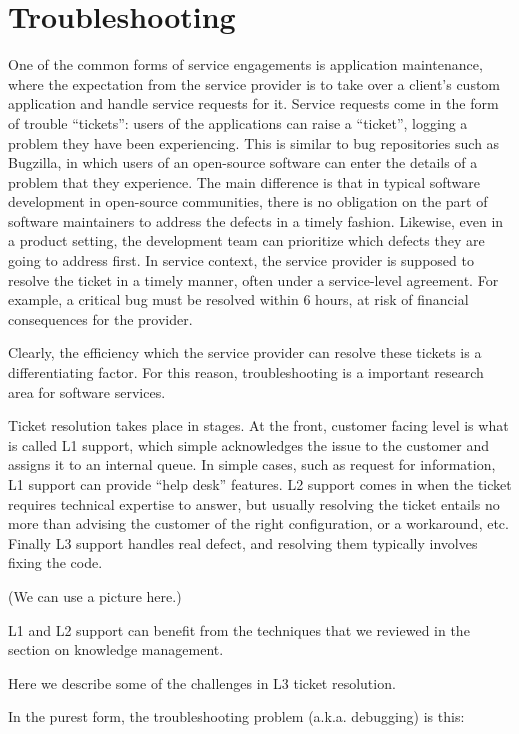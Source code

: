 \section{Troubleshooting}

One of the common forms of service engagements is application maintenance, where the expectation from the service provider is to take over a client's custom application and handle service requests for it.  Service requests come in the form of trouble ``tickets'': users of the applications can raise a ``ticket'', logging a problem they have been experiencing. This is similar to bug repositories such as Bugzilla, in which users of an open-source software can enter the details of a problem that they experience.  The main difference is that in typical software development in open-source communities, there is no obligation on the part of software maintainers to address the defects in a timely fashion. Likewise, even in a product setting, the development team can prioritize which defects they are going to address first.  In service context, the service provider is supposed to resolve the ticket in a timely manner, often under a service-level agreement. For example, a critical bug must be resolved within 6 hours, at risk of financial consequences for the provider. 

Clearly, the efficiency which the service provider can resolve these tickets is a differentiating factor. For this reason, troubleshooting is a important research area for software services.

Ticket resolution takes place in stages. At the front, customer facing level is what is called L1 support, which simple acknowledges the issue to the customer and assigns it to an internal queue. In simple cases, such as request for information, L1 support can provide ``help desk'' features. L2 support comes in when the ticket requires technical expertise to answer, but usually resolving the ticket entails no more than advising the customer of the right configuration, or a workaround, etc. Finally L3 support handles real defect, and resolving them typically involves fixing the code.

(We can use a picture here.)

L1 and L2 support can benefit from the techniques that we reviewed in the section on knowledge management.

Here we describe some of the challenges in L3 ticket resolution.

In the purest form, the troubleshooting problem (a.k.a. debugging) is this: 